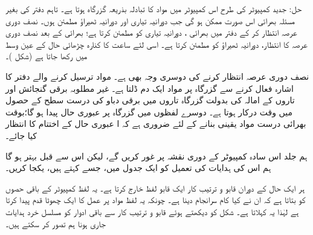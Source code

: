 حل:\quad
جدید کمپیوٹر کی طرح اس کمپیوٹر میں مواد کا تبادلہ بذریعہ   گزرگاہ ہوتا ہے۔ تاہم دفتر  کی بغیر مسئلہ  بھرائی اس صورت ممکن ہو گی  جب دورانیہ تیاری اور  دورانیہ  ٹھیراؤ  مطمئن ہوں۔ نصف  دوری عرصہ انتظار   کر  کے دفتر میں  بھرائی ، دورانیہ تیاری کو مطمئن کرتا ہے؛ بھرائی کے بعد نصف دوری عرصہ کا انتظار، دورانیہ ٹھیراؤ کو مطمئن کرتا ہے۔ اسی لئے ساعت کا کنارہ چڑھائی   حال کے عین وسط میں رکھا جاتا ہے (شکل  )۔

نصف دوری عرصہ انتظار کرنے کی  دوسری وجہ بھی ہے۔ مواد ترسیل کرنے والے دفتر کا    اشارہ فعال کرنے  سے  گزرگاہ  پر مواد ایک دم ڈلتا ہے۔ غیر مطلوبہ  برقی گنجائش اور تاروں کے    امالہ کی بدولت  گزرگاہ  تاروں میں برقی دباو کی درست  سطح  کے حصول میں وقت درکار ہوتا ہے۔ دوسرے لفظوں میں    گزرگاہ  پر عبوری حال   پیدا ہو گا؛بوقت بھرائی درست مواد یقینی بنانے کے لئے ضروری ہے کہ  ا عبوری حال  کے اختتام  کا  انتظار کیا جائے۔

ہم جلد اس سادہ کمپیوٹر   کے دوری  نقشہ  پر غور کریں گے، لیکن اس سے قبل بہتر ہو گا ہم اس کی ہدایات کی تعمیل کو ایک  جدول میں،  جسے کہتے ہیں،  یکجا کریں۔

ہر ایک  حال کے دوران قابو و ترتیب کار ایک قابو لفظ خارج کرتا ہے۔ یہ  لفظ  کمپیوٹر کے باقی حصوں کو  بتاتا ہے کہ ان  نے کیا کام سرانجام دینا ہے۔ چونکہ   یہ  لفظ مواد پر عمل  کا ایک چھوٹا قدم  پیدا کرتا ہے لہٰذا یہ  کہلاتا ہے۔ شکل  کو دیکھتے ہوئے   قابو و ترتیب کار سے باقی ادوار کو مسلسل خرد ہدایات جاری ہونا  ہم تصور کر سکتے ہیں۔

